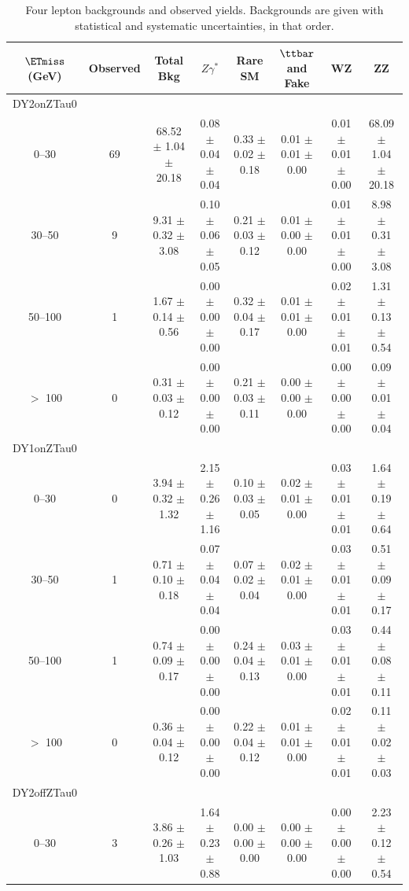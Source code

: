 \newpage
\begin{table}[htp]
\begin{center}
\caption{\label{tab:fourLeptonResults} Four lepton backgrounds and observed yields. Backgrounds are given with statistical and systematic uncertainties, in that order.}
\tiny
\begin{tabular}{|c|c|c|ccccc|}\hline\hline
$\ETmiss$ (GeV) & Observed & Total Bkg &  $Z\gamma^{*}$ &  Rare SM & $\ttbar$ and Fake & WZ & ZZ  \\
\hline
DY2onZTau0\\
\hline
0--30 & 69 & 68.52 $\pm$ 1.04 $\pm$ 20.18 & 0.08 $\pm$ 0.04 $\pm$ 0.04 & 0.33 $\pm$ 0.02 $\pm$ 0.18 & 0.01 $\pm$ 0.01 $\pm$ 0.00 & 0.01 $\pm$ 0.01 $\pm$ 0.00 & 68.09 $\pm$ 1.04 $\pm$ 20.18 \\
30--50 & 9 & 9.31 $\pm$ 0.32 $\pm$ 3.08 & 0.10 $\pm$ 0.06 $\pm$ 0.05 & 0.21 $\pm$ 0.03 $\pm$ 0.12 & 0.01 $\pm$ 0.00 $\pm$ 0.00 & 0.01 $\pm$ 0.01 $\pm$ 0.00 & 8.98 $\pm$ 0.31 $\pm$ 3.08 \\
50--100 & 1 & 1.67 $\pm$ 0.14 $\pm$ 0.56 & 0.00 $\pm$ 0.00 $\pm$ 0.00 & 0.32 $\pm$ 0.04 $\pm$ 0.17 & 0.01 $\pm$ 0.01 $\pm$ 0.00 & 0.02 $\pm$ 0.01 $\pm$ 0.01 & 1.31 $\pm$ 0.13 $\pm$ 0.54 \\
$>$ 100 & 0 & 0.31 $\pm$ 0.03 $\pm$ 0.12 & 0.00 $\pm$ 0.00 $\pm$ 0.00 & 0.21 $\pm$ 0.03 $\pm$ 0.11 & 0.00 $\pm$ 0.00 $\pm$ 0.00 & 0.00 $\pm$ 0.00 $\pm$ 0.00 & 0.09 $\pm$ 0.01 $\pm$ 0.04 \\
\hline
DY1onZTau0\\
\hline
0--30 & 0 & 3.94 $\pm$ 0.32 $\pm$ 1.32 & 2.15 $\pm$ 0.26 $\pm$ 1.16 & 0.10 $\pm$ 0.03 $\pm$ 0.05 & 0.02 $\pm$ 0.01 $\pm$ 0.00 & 0.03 $\pm$ 0.01 $\pm$ 0.01 & 1.64 $\pm$ 0.19 $\pm$ 0.64 \\
30--50 & 1 & 0.71 $\pm$ 0.10 $\pm$ 0.18 & 0.07 $\pm$ 0.04 $\pm$ 0.04 & 0.07 $\pm$ 0.02 $\pm$ 0.04 & 0.02 $\pm$ 0.01 $\pm$ 0.00 & 0.03 $\pm$ 0.01 $\pm$ 0.01 & 0.51 $\pm$ 0.09 $\pm$ 0.17 \\
50--100 & 1 & 0.74 $\pm$ 0.09 $\pm$ 0.17 & 0.00 $\pm$ 0.00 $\pm$ 0.00 & 0.24 $\pm$ 0.04 $\pm$ 0.13 & 0.03 $\pm$ 0.01 $\pm$ 0.00 & 0.03 $\pm$ 0.01 $\pm$ 0.01 & 0.44 $\pm$ 0.08 $\pm$ 0.11 \\
$>$ 100 & 0 & 0.36 $\pm$ 0.04 $\pm$ 0.12 & 0.00 $\pm$ 0.00 $\pm$ 0.00 & 0.22 $\pm$ 0.04 $\pm$ 0.12 & 0.01 $\pm$ 0.01 $\pm$ 0.00 & 0.02 $\pm$ 0.01 $\pm$ 0.01 & 0.11 $\pm$ 0.02 $\pm$ 0.03 \\
\hline
DY2offZTau0\\
\hline
0--30 & 3 & 3.86 $\pm$ 0.26 $\pm$ 1.03 & 1.64 $\pm$ 0.23 $\pm$ 0.88 & 0.00 $\pm$ 0.00 $\pm$ 0.00 & 0.00 $\pm$ 0.00 $\pm$ 0.00 & 0.00 $\pm$ 0.00 $\pm$ 0.00 & 2.23 $\pm$ 0.12 $\pm$ 0.54 \\

\end{tabular}
\end{center}
\end{table}
